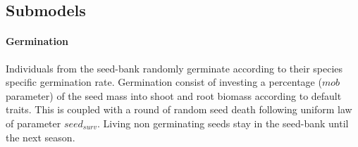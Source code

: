 \subsection{Submodels}\label{subsection:submodels}

\paragraph{Germination} Individuals from the seed-bank randomly germinate according to their species specific germination rate. Germination consist of investing a percentage ($mob$ parameter) of the seed mass into shoot and root biomass according to default traits. This is coupled with a round of random seed death following uniform law of parameter $seed_{surv}$. Living non germinating seeds stay in the seed-bank until the next season.\\
%
%
% 
%
%

